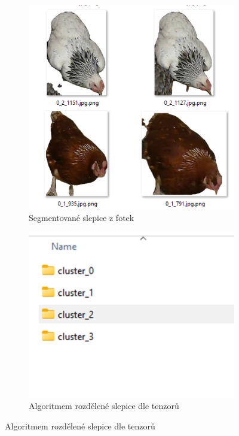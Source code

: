 \begin{figure}[h]
    \begin{subfigure}[t]{1\textwidth}
        \centering
        \includegraphics[width=\textwidth]{img/segmented_chicks}
        \caption{Segmentované slepice z fotek}
        \label{fig:segmented_chicks2}
    \end{subfigure}

    \begin{subfigure}[t]{1\textwidth}
        \centering
        \includegraphics[width=\textwidth]{img/chicks_in_clusters}
        \caption{Algoritmem rozdělené slepice dle tenzorů}
        \label{fig:chicks_in_clusters}
    \end{subfigure}
\end{figure}
